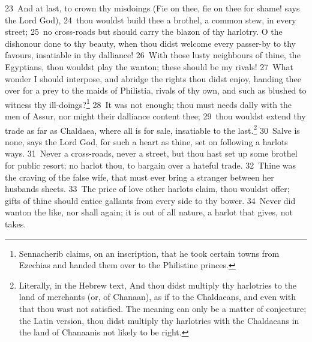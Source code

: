 \documentclass[10pt]{book} %
\begin{document}
\textcolor{benred8}{23}~And at last, to crown thy misdoings (Fie on thee, fie on thee for shame! says the Lord God), \textcolor{benred8}{24}~thou wouldst build thee a brothel, a common stew, in every street; \textcolor{benred8}{25}~no cross-roads but should carry the blazon of thy harlotry. O the dishonour done to thy beauty, when thou didst welcome every passer-by to thy favours, insatiable in thy dalliance! \textcolor{benred8}{26}~With those lusty neighbours of thine, the Egyptians, thou wouldst play the wanton; these should be my rivals! \textcolor{benred8}{27}~What wonder I should interpose, and abridge the rights thou didst enjoy, handing thee over for a prey to the maids of Philistia, rivals of thy own, and such as blushed to witness thy ill-doings?\footnote[1]{Sennacherib claims, on an inscription, that he took certain towns from Ezechias and handed them over to the Philistine princes.} \textcolor{benred8}{28}~It was not enough; thou must needs dally with the men of Assur, nor might their dalliance content thee; \textcolor{benred8}{29}~thou wouldst extend thy trade as far as Chaldaea, where all is for sale, insatiable to the last.\footnote[2]{Literally, in the Hebrew text, \textasciigrave And thou didst multiply thy harlotries to the land of merchants (or, of Chanaan), as if to the Chaldaeans, and even with that thou wast not satisfied\textquotesingle . The meaning can only be a matter of conjecture; the Latin version, \textasciigrave thou didst multiply thy harlotries with the Chaldaeans in the land of Chanaan\textquotesingle  is not likely to be right.}
\textcolor{benred8}{30}~Salve is none, says the Lord God, for such a heart as thine, set on following a harlot\textquotesingle s ways. \textcolor{benred8}{31}~Never a cross-roads, never a street, but thou hast set up some brothel for public resort; no harlot thou, to bargain over a hateful trade. \textcolor{benred8}{32}~Thine was the craving of the false wife, that must ever bring a stranger between her husband\textquotesingle s sheets. \textcolor{benred8}{33}~The price of love other harlots claim, thou wouldst offer; gifts of thine should entice gallants from every side to thy bower. \textcolor{benred8}{34}~Never did wanton the like, nor shall again; it is out of all nature, a harlot that gives, not takes.
\end{document}
